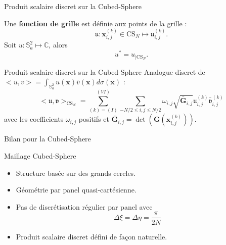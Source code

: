 \documentclass[11pt]{beamer}
\def\CS{\text{CS}}
\def\gint{\displaystyle\int}
\def\gsum{\displaystyle\sum\limits}
\begin{document}
\begin{frame}{Produit scalaire discret sur la Cubed-Sphere}
\begin{block}{}
Une \textbf{fonction de grille} est définie aux points de la grille :
$$\mathfrak{u} : \mathbf{x}_{i,j}^{(k)} \in \CS_N \mapsto \mathfrak{u}_{i,j}^{(k)}.$$
Soit $u : \mathbb{S}_a^2 \mapsto \mathbb{C}$, alors $$u^* = u_{| \CS_N}. $$
\end{block}
\begin{block}{Produit scalaire discret sur la Cubed-Sphere}
Analogue discret de $<u,v> = \gint_{\mathbb{S}_a^2} u(\mathbf{x}) \bar{v}(\mathbf{x}) d \sigma(\mathbf{x})$ :
$$<\mathfrak{u},\mathfrak{v}>_{\CS_N} = \gsum_{(k) = (I)}^{(VI)} \gsum_{-N/2 \leq i,j \leq N/2} \omega_{i,j} \sqrt{\bar{\mathbf{G}}_{i,j}} \mathfrak{u}_{i,j}^{(k)} \bar{\mathfrak{v}}_{i,j}^{(k)}$$
avec les coefficients $\omega_{i,j}$ positifs et $\bar{\mathbf{G}}_{i,j} = \det ( \mathbf{G}(\mathbf{x}_{i,j}^{(k)}))$.
\end{block}
\end{frame}














\begin{frame}{Bilan pour la Cubed-Sphere}
\begin{block}{Maillage Cubed-Sphere}
\begin{itemize}
\item Structure basée sur des grands cercles.
\item Géométrie par panel quasi-cartésienne.
\item Pas de discrétisation régulier par panel avec
$$
\Delta \xi  = \Delta \eta = \dfrac{\pi}{2N}
$$
\item Produit scalaire discret défini de façon naturelle.
\end{itemize}
\end{block}
\end{frame}















\end{document}
